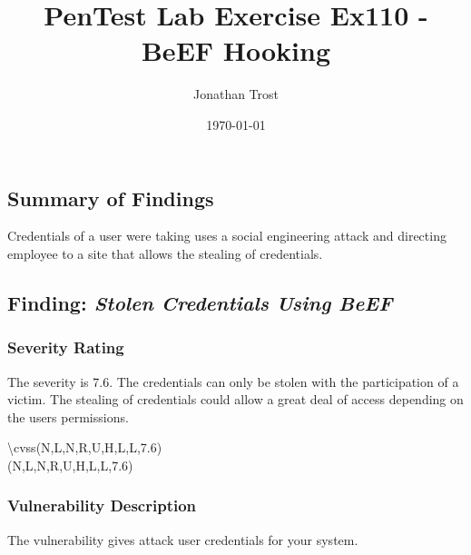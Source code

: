 \documentclass[notitlepage]{article}
\begin{document}
	
	
	\title{PenTest Lab Exercise Ex110 - BeEF Hooking}
	\author{Jonathan Trost}
	\date{\isodate\today}
	
	\maketitle
	
	\tableofcontents
	
	\newpage
	
	\subsection{Summary of Findings}
	\indent Credentials of a user were taking uses a social engineering attack and directing employee to a site that allows the stealing of credentials. 
	
	\subsection{Finding: \emph{Stolen Credentials Using BeEF}}
	
	\subsubsection{Severity Rating}
	\indent The severity is 7.6. The credentials can only be stolen with the participation of a victim. The stealing of credentials could allow a great deal of access depending on the users permissions. 
	
	\textbackslash cvss(N,L,N,R,U,H,L,L,7.6)\\
	\cvss(N,L,N,R,U,H,L,L,7.6) \\
	
	\subsubsection{Vulnerability Description}
	\indent The vulnerability gives attack user credentials for your system.  
	
\end{document}
